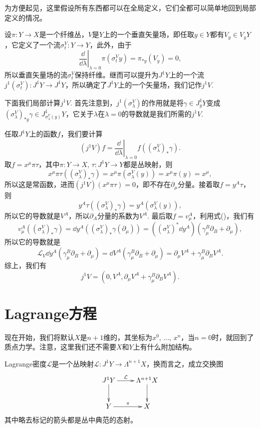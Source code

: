 \begin{para}[垂直矢量场的提升]
    为方便起见，这里假设所有东西都可以在全局定义，它们全都可以简单地回到局部定义的情况。

    设$\pi:Y\to X$是一个纤维丛，$V$是$Y$上的一个垂直矢量场，即任取$y\in Y$都有$V_y\in V_yY$，它定义了一个流$\sigma^V_t:Y\to Y$，此外，由于
    \[
        \left.\frac{\dd}{\dd \lambda}\right|_{\lambda=0}\pi(\sigma^V_ty)=\pi_{*y}(V_y)=0,
    \]
    所以垂直矢量场的流$\sigma^V_t$保持纤维。继而可以提升为$J^1Y$上的一个流$j^1(\sigma^V_t):J^1Y\to J^1Y$，所以确定了$J^1Y$上的一个矢量场，我们记作$j^1V$.

    下面我们局部计算$j^1V$. 首先注意到，$j^1(\sigma^V_\lambda)$的作用就是将$\gamma\in J^1_yY$变成$(\sigma^V_\lambda)_{*y}\gamma\in J^1_{\sigma^V_\lambda(y)}Y$，它关于$\lambda$在$\lambda=0$的导数就是我们所需的$j^1V$.

    任取$J^1Y$上的函数$f$，我们要计算
    \[
        (j^1V)f=\left.\frac{\dd}{\dd \lambda}\right|_{\lambda=0}f((\sigma^V_\lambda)_{*}\gamma).
    \]
    取$f=x^\mu\pi\tau$，其中$\pi:Y\to X$, $\tau:J^1Y\to Y$都是丛映射，则
    \[
        x^\mu\pi\tau((\sigma^V_\lambda)_{*}\gamma)=x^\mu\pi(\sigma^V_\lambda(y))=x^\mu\pi(y)=x^\mu,
    \]
    所以这是常函数，进而$(j^1V)(x^\mu\pi\tau)=0$，即不存在$\partial_{\mu}$分量。接着取$f=y^A\tau$，则
    \[
        y^A\tau((\sigma^V_\lambda)_{*}\gamma)=y^A(\sigma^V_\lambda(y)),
    \]
    所以它的导数就是$V^A$，所以$\partial_A$分量的系数为$V^A$. 最后取$f=v^A_\mu$，利用式(\theequation)，我们有
    \[
        v^A_\mu((\sigma^V_\lambda)_{*}\gamma)=\dd y^A((\sigma^V_\lambda)_{*}\gamma(\partial_\mu))=\left ((\sigma^V_\lambda)^{*}\dd y^A\right )(\gamma_\mu^B\partial_B+\partial_\mu),
    \]
    所以它的导数就是
    \[
        \mathscr L_V\dd y^A(\gamma_\mu^B\partial_B+\partial_\mu)=\dd V^A(\gamma_\mu^B\partial_B+\partial_\mu)=\partial_\mu V^A+\gamma^B_\mu \partial_B V^A.
    \]
    综上，我们有
    \[
        j^1V=\left(0,V^A,\partial_\mu V^A+\gamma^B_\mu \partial_B V^A\right).
    \]
\end{para}

\section{Lagrange方程}

现在开始，我们将默认$X$是$n+1$维的，其坐标为$x^0$, $\dots$, $x^n$，当$n=0$时，就回到了质点力学。注意，这里我们还不需要$X$和$Y$上有什么附加结构。

\begin{para}[Lagrange密度]
    Lagrange密度$\mathcal L$是一个丛映射$\mathcal L:J^1Y\to \Lambda^{n+1}X$，换而言之，成立交换图
    \[
        \xymatrix{
            J^1Y\ar[d]\ar[r]^-{\mathcal L}&\Lambda^{n+1}X\ar[d]\\
            Y\ar[r]^\pi&X
        }
    \]
    其中略去标记的箭头都是丛中典范的态射。
\end{para}

